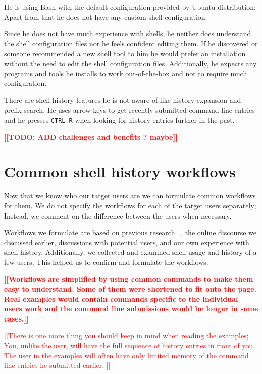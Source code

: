 \documentclass[thesis=M,english]{FITthesis}[2012/10/20]
\newcommand{\todotext}[1]{\textcolor{red}{\textbf{[[#1]]}}}
\newcommand{\redtext}[1]{\textcolor{red}{[[#1]]}}
\let\myCite\cite
\renewcommand\cite{\unskip~\myCite}
\begin{document}
He is using Bash with the default configuration provided by Ubuntu distribution; Apart from that he does not have any custom shell configuration. 

Since he does not have much experience with shells, he neither does understand the shell configuration files nor he feels confident editing them. If he discovered or someone recommended a new shell tool to him he would prefer an installation without the need to edit the shell configuration files. Additionally, he expects any programs and tools he installs to work out-of-the-box and not to require much configuration. 

There are shell history features he is not aware of like history expansion and prefix search. He uses arrow keys to get recently submitted command line entries and he presses \verb|CTRL-R| when looking for history entries further in the past. 

\todotext{TODO: ADD challenges and benefits ? maybe}


\section{Common shell history workflows}

Now that we know who our target users are we can formulate common workflows for them. We do not specify the workflows for each of the target users separately; Instead, we comment on the difference between the users when necessary. 

Workflows we formulate are based on previous research \cite{greenberg1993computer}, the online discourse we discussed earlier, discussions with potential users, and our own experience with shell history. Additionally, we collected and examined shell usage and history of a few users; This helped us to confirm and formulate the workflows.

\todotext{Workflows are simplified by using common commands to make them easy to understand. Some of them were shortened to fit onto the page. Real examples would contain commands specific to the individual users work and the command line submissions would be longer in some cases.}

\redtext{There is one more thing you should keep in mind when reading the examples; You, unlike the user, will have the full sequence of history entries in front of you. The user in the examples will often have only limited memory of the command line entries he submitted earlier. }
\end{document}
